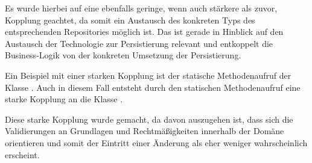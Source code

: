Es wurde hierbei auf eine ebenfalls geringe, wenn auch stärkere als zuvor, Kopplung geachtet, da somit ein Austausch des konkreten Typs des entsprechenden Repositories möglich ist.
Das ist gerade in Hinblick auf den Austausch der Technologie zur Persistierung relevant und entkoppelt die Business-Logik von der konkreten Umsetzung der Persistierung.

Ein Beispiel mit einer starken Kopplung ist der statische Methodenaufruf \href{https://github.com/lucasmerkel/dhbw-advancedswe-programmentwurf/blob/5764d7da4cfd0562ed8e96128e92f85c30b7309d/swe_programmentwurf/consumergoods-inventory-planner/3-cip-domain/src/main/java/de/dhbw/cip/domain/DateValidator.java#L10}{} der Klasse .
Auch in diesem Fall entsteht durch den statischen Methodenaufruf eine starke Kopplung an die Klasse \href{https://github.com/lucasmerkel/dhbw-advancedswe-programmentwurf/blob/5764d7da4cfd0562ed8e96128e92f85c30b7309d/swe_programmentwurf/consumergoods-inventory-planner/3-cip-domain/src/main/java/de/dhbw/cip/domain/DateValidator.java}{}.

Diese starke Kopplung wurde gemacht, da davon auszugehen ist, dass sich die Validierungen an Grundlagen und Rechtmäßigkeiten innerhalb der Domäne orientieren und somit der Eintritt einer Änderung als eher weniger wahrscheinlich erscheint.


